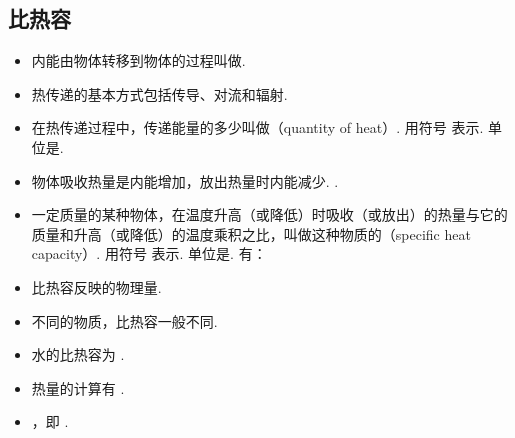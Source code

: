 \subsection{比热容}
\vspace{10pt}
\begin{itemize}
\item 内能由物体转移到物体的过程叫做.
\item 热传递的基本方式包括传导、对流和辐射.
\item 在热传递过程中，传递能量的多少叫做（quantity of heat）. 用符号  表示. 单位是. 
\item 物体吸收热量是内能增加，放出热量时内能减少. .
\item 一定质量的某种物体，在温度升高（或降低）时吸收（或放出）的热量与它的质量和升高（或降低）的温度乘积之比，叫做这种物质的（specific heat capacity）. 用符号  表示. 单位是. 有：
\item 比热容反映的物理量.
\item 不同的物质，比热容一般不同.
\item 水的比热容为 .
\item 热量的计算有 .
\item {}，即 .
\end{itemize}